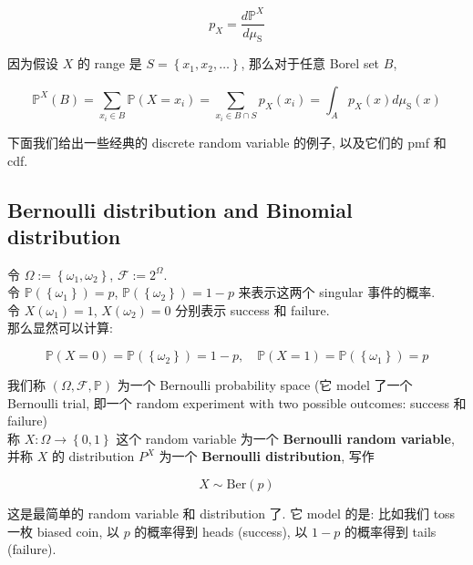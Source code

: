 \documentclass{qlnotes-export}
\begin{document}
\[p_{X} = \frac{d{\mathbb{P}}^{X}}{d\mu_{\text{S}}}\]

因为假设 \(X\) 的 range 是 \(S = \left\{ {x_{1},x_{2},\ldots} \right\}\), 那么对于任意 Borel set \(B\),

\[{\mathbb{P}}^{X}(B) = \sum\limits_{x_{i} \in B}{\mathbb{P}}(X = x_{i}) = \sum\limits_{x_{i} \in B \cap S}p_{X}(x_{i}) = \int_{A}p_{X}(x) d\mu_{\text{S}}(x)\]

下面我们给出一些经典的 discrete random variable 的例子, 以及它们的 pmf 和 cdf.

\subsection{Bernoulli distribution and Binomial distribution}\label{bernoulli-distribution-and-binomial-distribution}

\begin{example}\label{ex-02-random-variables-bernoulli-distribution}

令 \(\Omega := \left\{ {\omega_{1},\omega_{2}} \right\}\), \(\mathcal{F} := 2^{\Omega}\).\\
令 \({\mathbb{P}}(\left\{ \omega_{1} \right\}) = p\), \({\mathbb{P}}(\left\{ \omega_{2} \right\}) = 1 - p\) 来表示这两个 singular 事件的概率.\\
令 \(X(\omega_{1}) = 1\), \(X(\omega_{2}) = 0\) 分别表示 success 和 failure.\\
那么显然可以计算:

\[{\mathbb{P}}(X = 0) = {\mathbb{P}}(\left\{ \omega_{2} \right\}) = 1 - p,\quad{\mathbb{P}}(X = 1) = {\mathbb{P}}(\left\{ \omega_{1} \right\}) = p\]

我们称 \((\Omega,\mathcal{F},{\mathbb{P}})\) 为一个 Bernoulli probability space (它 model 了一个 Bernoulli trial, 即一个 random experiment with two possible outcomes: success 和 failure)\\
称 \(X:\Omega\rightarrow\left\{ {0,1} \right\}\) 这个 random variable 为一个 \textbf{Bernoulli random variable}, 并称 \(X\) 的 distribution \(P^{X}\) 为一个 \textbf{Bernoulli distribution}, 写作

\[X \sim \text{Ber}(p)\]

这是最简单的 random variable 和 distribution 了. 它 model 的是: 比如我们 toss 一枚 biased coin, 以 \(p\) 的概率得到 heads (success), 以 \(1 - p\) 的概率得到 tails (failure).\\

\end{example}
\end{document}
